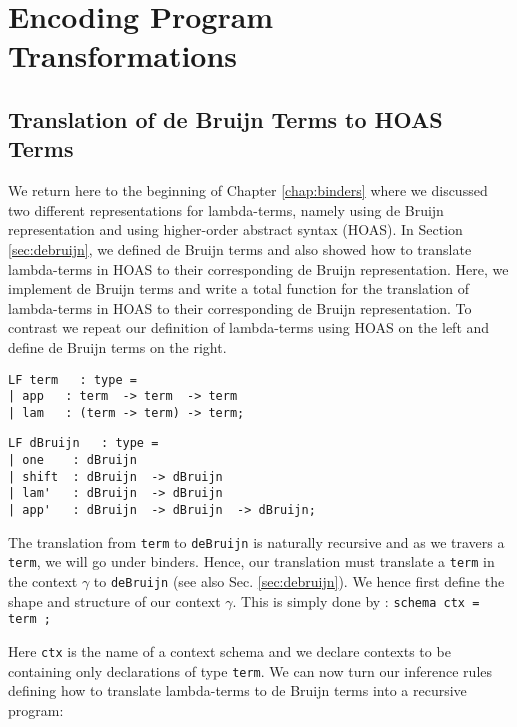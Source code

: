 \chapter{Encoding Program Transformations }
\section{Translation of de Bruijn Terms to HOAS Terms}
We return here to the beginning of Chapter \ref{chap:binders} where we discussed two different representations for lambda-terms, namely using de Bruijn representation and using higher-order abstract syntax (HOAS). In Section \ref{sec:debruijn}, we defined de Bruijn terms and also showed how to translate lambda-terms in HOAS to their corresponding de Bruijn representation. Here, we implement de Bruijn terms and write a total function for the translation of lambda-terms in HOAS to their corresponding  de Bruijn representation.  To contrast we repeat our definition of lambda-terms using HOAS on the left and define de Bruijn terms on the right.

\begin{minipage}[t]{7cm}
\begin{lstlisting}
LF term   : type =
| app   : term  -> term  -> term
| lam   : (term -> term) -> term;
  \end{lstlisting}
\end{minipage}
\begin{minipage}[t]{7cm}
\begin{lstlisting}
LF dBruijn   : type =
| one    : dBruijn
| shift  : dBruijn  -> dBruijn
| lam'   : dBruijn  -> dBruijn
| app'   : dBruijn  -> dBruijn  -> dBruijn;
\end{lstlisting}
\end{minipage}

The translation from \lstinline!term! to \lstinline!deBruijn! is naturally recursive and as we travers a \lstinline!term!, we will go under binders. Hence, our translation must translate a \lstinline!term! in the context $\gamma$ to \lstinline!deBruijn! (see also Sec. \ref{sec:debruijn}).
We hence first define the shape and structure of our context $\gamma$. This is
simply done by : \lstinline!schema ctx = term ; !


Here \lstinline!ctx! is the name of a context schema and we declare
contexts to be containing only declarations of type \lstinline!term!.
We can now turn our inference rules defining how to translate
lambda-terms to de Bruijn terms into a recursive program:


